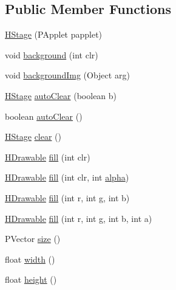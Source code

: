 \subsection*{Public Member Functions}
\begin{DoxyCompactItemize}
\item 
\hyperlink{classhype_1_1drawable_1_1_h_stage_a4086f757c1e2526d5860702f9995266a}{H\-Stage} (P\-Applet papplet)
\item 
void \hyperlink{classhype_1_1drawable_1_1_h_stage_af1ff3b0bbed199f9598390d0c6e1fa52}{background} (int clr)
\item 
void \hyperlink{classhype_1_1drawable_1_1_h_stage_a65a79edea99bfe95d59e9804570da47c}{background\-Img} (Object arg)
\item 
\hyperlink{classhype_1_1drawable_1_1_h_stage}{H\-Stage} \hyperlink{classhype_1_1drawable_1_1_h_stage_aa7e16679919e838d627575177ca33caf}{auto\-Clear} (boolean b)
\item 
boolean \hyperlink{classhype_1_1drawable_1_1_h_stage_af786be1efb5c94a181ddad3501e4ec23}{auto\-Clear} ()
\item 
\hyperlink{classhype_1_1drawable_1_1_h_stage}{H\-Stage} \hyperlink{classhype_1_1drawable_1_1_h_stage_a5a1b9aed8825271e0ac7518823ac4605}{clear} ()
\item 
\hyperlink{classhype_1_1drawable_1_1_h_drawable}{H\-Drawable} \hyperlink{classhype_1_1drawable_1_1_h_stage_a358900abe01843d80af0f4b5bab43547}{fill} (int clr)
\item 
\hyperlink{classhype_1_1drawable_1_1_h_drawable}{H\-Drawable} \hyperlink{classhype_1_1drawable_1_1_h_stage_a615cc7b2597bbf75a21eef6fedbed87d}{fill} (int clr, int \hyperlink{classhype_1_1drawable_1_1_h_drawable_a03c7275f5caab5cc9034b18d4c2f1305}{alpha})
\item 
\hyperlink{classhype_1_1drawable_1_1_h_drawable}{H\-Drawable} \hyperlink{classhype_1_1drawable_1_1_h_stage_a55c66dfd278df300fcb6c96988dbb4da}{fill} (int r, int g, int b)
\item 
\hyperlink{classhype_1_1drawable_1_1_h_drawable}{H\-Drawable} \hyperlink{classhype_1_1drawable_1_1_h_stage_a8ac704c5f91e673b1c7786be8cc398fd}{fill} (int r, int g, int b, int a)
\item 
P\-Vector \hyperlink{classhype_1_1drawable_1_1_h_stage_a4d1a4833d6ab9bcfdce2f5a0d534d1ef}{size} ()
\item 
float \hyperlink{classhype_1_1drawable_1_1_h_stage_ae31a077cefbeb64d9d90cf109a3f01d9}{width} ()
\item 
float \hyperlink{classhype_1_1drawable_1_1_h_stage_a1fb08f04ae51f7e7f223a1f402d59803}{height} ()

\end{DoxyCompactItemize}
